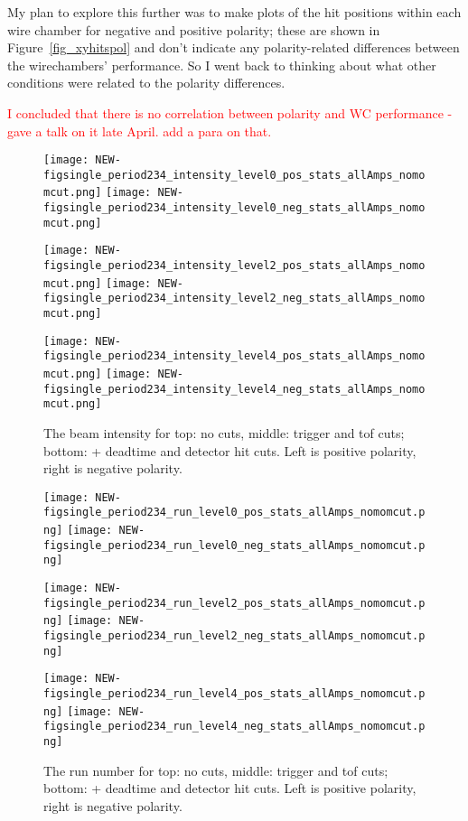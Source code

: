 My plan to explore this further was to make plots of the hit positions within each wire chamber for negative and positive polarity; these are shown in Figure~\ref{fig_xyhitspol} and don't indicate any polarity-related differences between the wirechambers' performance. So I went back to thinking about what other conditions were related to the polarity differences.

\textcolor{red}{I concluded that there is no correlation between polarity and WC performance - gave a talk on it late April. add a para on that.}


  \begin{figure}[h]
    \centering   
     	\texttt{[image: NEW-figsingle\_period234\_intensity\_level0\_pos\_stats\_allAmps\_nomomcut.png]}
	 \texttt{[image: NEW-figsingle\_period234\_intensity\_level0\_neg\_stats\_allAmps\_nomomcut.png]}
	 
   	\texttt{[image: NEW-figsingle\_period234\_intensity\_level2\_pos\_stats\_allAmps\_nomomcut.png]}
	 \texttt{[image: NEW-figsingle\_period234\_intensity\_level2\_neg\_stats\_allAmps\_nomomcut.png]}
	 
 	\texttt{[image: NEW-figsingle\_period234\_intensity\_level4\_pos\_stats\_allAmps\_nomomcut.png]}
	 \texttt{[image: NEW-figsingle\_period234\_intensity\_level4\_neg\_stats\_allAmps\_nomomcut.png]}
   \caption[short]{The beam intensity for top: no cuts, middle: trigger and tof cuts; bottom: + deadtime and detector hit cuts. Left is positive polarity, right is negative polarity.}
   \label{fig_intensity}
  \end{figure}
 
  \begin{figure}[h]
    \centering   
     	\texttt{[image: NEW-figsingle\_period234\_run\_level0\_pos\_stats\_allAmps\_nomomcut.png]}
	 \texttt{[image: NEW-figsingle\_period234\_run\_level0\_neg\_stats\_allAmps\_nomomcut.png]}
	 
   	\texttt{[image: NEW-figsingle\_period234\_run\_level2\_pos\_stats\_allAmps\_nomomcut.png]}
	 \texttt{[image: NEW-figsingle\_period234\_run\_level2\_neg\_stats\_allAmps\_nomomcut.png]}
	 
 	\texttt{[image: NEW-figsingle\_period234\_run\_level4\_pos\_stats\_allAmps\_nomomcut.png]}
	 \texttt{[image: NEW-figsingle\_period234\_run\_level4\_neg\_stats\_allAmps\_nomomcut.png]}
   \caption[short]{The run number for top: no cuts, middle: trigger and tof cuts; bottom: + deadtime and detector hit cuts. Left is positive polarity, right is negative polarity.}
   \label{fig_run}
  \end{figure}
  
